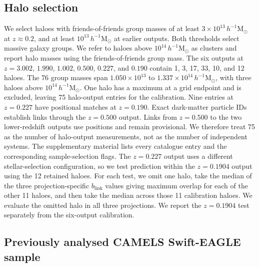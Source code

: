 \documentclass[usenatbib]{mnras}
\begin{document}
\subsection{Halo selection}
\label{sec:cut}

We select haloes with friends-of-friends group masses of at least
$3\times10^{13}\,h^{-1}\mathrm{M}_{\odot}$ at $z\approx0.2$, and at least
$10^{13}\,h^{-1}\mathrm{M}_{\odot}$ at earlier outputs.
Both thresholds select massive galaxy groups. We refer to haloes above
$10^{14}\,h^{-1}\mathrm{M}_{\odot}$ as clusters and report halo masses using the
friends-of-friends group mass.
The six outputs at $z=3.002$, $1.990$, $1.002$, $0.500$,
$0.227$, and $0.190$ contain 1, 3, 17, 33, 10, and 12 haloes.
The 76 group masses span $1.050\times10^{13}$ to
$1.337\times10^{14}\,h^{-1}\mathrm{M}_{\odot}$, with three haloes above
$10^{14}\,h^{-1}\mathrm{M}_{\odot}$. One halo has a maximum at a grid endpoint
and is excluded, leaving 75 halo-output entries for the calibration.
Nine entries at $z=0.227$ have positional matches at $z=0.190$.
Exact dark-matter particle IDs establish links through the $z=0.500$
output. Links from $z=0.500$ to the two lower-redshift outputs use
positions and remain provisional.
We therefore treat 75 as the number of halo-output measurements, not
as the number of independent systems. The supplementary material lists
every catalogue entry and the corresponding sample-selection flags.
The $z=0.227$ output uses a different stellar-selection configuration, so
we test prediction within the $z=0.1904$ output using the 12 retained
haloes. For each test, we omit one halo, take the median of the three
projection-specific $b_{\mathrm{link}}$ values giving maximum overlap
for each of the other 11 haloes, and then take the median across those
11 calibration haloes. We evaluate the omitted halo in all three
projections. We report the $z=0.1904$ test separately from the six-output
calibration.

\subsection{Previously analysed CAMELS Swift-EAGLE sample}
\label{sec:camels}
\end{document}
